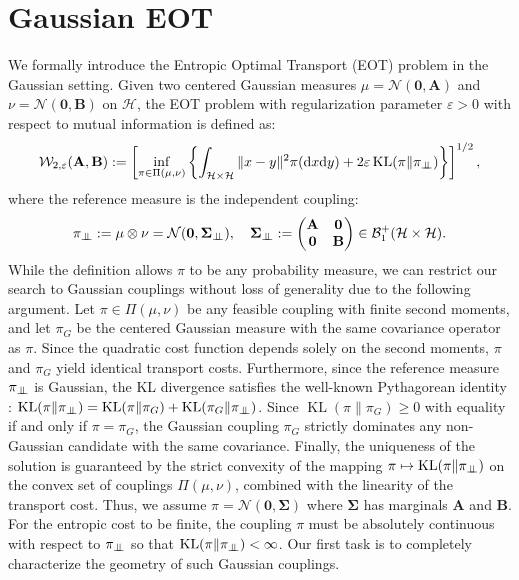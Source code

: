 \documentclass[noinfoline]{imsart}\setcounter{tocdepth}{2}
\newcommand{\m}[1]{\mathbf{#1}}
\renewcommand{\c}[1]{\mathcal{#1}}
\newcommand{\rd}{\mathrm{d}}
\newcommand{\indep}{\perp\mkern-9.5mu\perp}
\DeclareMathOperator{\KL}{KL}
\theoremstyle{plain}
\begin{document}
\section{Gaussian EOT}
We formally introduce the Entropic Optimal Transport (EOT) problem in the Gaussian setting. Given two centered Gaussian measures $\mu = \c{N}(\m{0}, \m{A})$ and $\nu = \c{N}(\m{0}, \m{B})$ on $\c{H}$, the EOT problem with regularization parameter $\varepsilon > 0$ with respect to mutual information is defined as:
\begin{align*}
    \c{W}_{2, \varepsilon} (\m{A}, \m{B}) := \left[ \inf_{\pi \in \Pi(\mu, \nu)} \left\{ \int_{\c{H} \times \c{H}} \|x-y\|^{2} \pi(\rd x \rd y) + 2 \varepsilon \KL(\pi \| \pi_{\indep}) \right\} \right]^{1/2},
\end{align*}
where the reference measure is the independent coupling:
\begin{align*}
    \pi_{\indep} := \mu \otimes \nu = \c{N}(\m{0}, \m{\Sigma}_{\indep}), \quad \m{\Sigma}_{\indep} := \begin{pmatrix} \m{A} & \m{0} \\ \m{0} & \m{B} \end{pmatrix} \in \c{B}_{1}^{+}(\c{H} \times \c{H}).
\end{align*}
While the definition allows $\pi$ to be any probability measure, we can restrict our search to Gaussian couplings without loss of generality due to the following argument.
Let $\pi \in \Pi(\mu, \nu)$ be any feasible coupling with finite second moments, and let $\pi_{G}$ be the centered Gaussian measure with the same covariance operator as $\pi$. Since the quadratic cost function depends solely on the second moments, $\pi$ and $\pi_{G}$ yield identical transport costs. 
Furthermore, since the reference measure $\pi_{\indep}$ is Gaussian, the KL divergence satisfies the well-known Pythagorean identity \cite{csiszar1975divergence}: $\KL(\pi \| \pi_{\indep}) = \KL(\pi \| \pi_{G}) + \KL(\pi_{G} \| \pi_{\indep})$.
Since $\KL(\pi \| \pi_{G}) \ge 0$ with equality if and only if $\pi = \pi_{G}$, the Gaussian coupling $\pi_{G}$ strictly dominates any non-Gaussian candidate with the same covariance. 
Finally, the uniqueness of the solution is guaranteed by the strict convexity of the mapping $\pi \mapsto \KL(\pi \| \pi_{\indep})$ on the convex set of couplings $\Pi(\mu, \nu)$, combined with the linearity of the transport cost.
Thus, we assume $\pi = \c{N}(\m{0}, \m{\Sigma})$ where $\m{\Sigma}$ has marginals $\m{A}$ and $\m{B}$.
For the entropic cost to be finite, the coupling $\pi$ must be absolutely continuous with respect to $\pi_{\indep}$ so that $\KL(\pi \| \pi_{\indep}) < \infty$. Our first task is to completely characterize the geometry of such Gaussian couplings.
\end{document}

